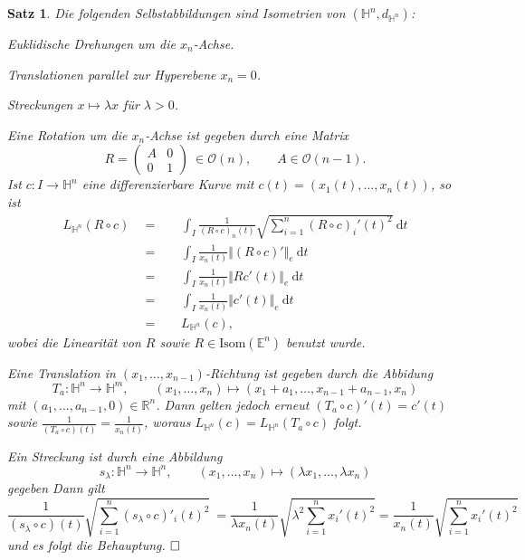\documentclass[11pt]{book}
\numberwithin{dummy}{section}
\newtheorem{theorem}{Satz}[section]
\theoremstyle{nonumberbreak}
\newenvironment{pr}[1][]{\ifthenelse{\equal{#1}{}}{\proof}{\proof[#1]}\rm}{\endproof}
\newcommand{\E}{\mathbb{E}}
\newcommand{\R}{\mathbb{R}}
\newcommand{\He}{\mathbb{H}}
\newcommand{\la}{\longrightarrow}
\begin{document}
\begin{spacing}{1.4}
\hypertarget{satzvierviereins}{}
\begin{theorem}
Die folgenden Selbstabbildungen sind Isometrien von $(\He^n, d_{\He^n})$:
\begin{compactenum}
\item Euklidische Drehungen um die $x_n$-Achse.
\item Translationen parallel zur Hyperebene $x_n=0$.
\item Streckungen $x \mapsto \lambda x$ für $\lambda >0$. 
\end{compactenum}
\begin{pr}
\begin{compactenum}
\item Eine Rotation um die $x_n$-Achse ist gegeben durch eine Matrix
$$R= \begin{pmatrix} A & 0 \\[-6pt] 0 & 1 \end{pmatrix} \ \in \mathcal{O}(n), \qquad A \in \mathcal{O}(n-1).$$
Ist $c: I \la \He^n$ eine differenzierbare Kurve mit $c(t) = (x_1(t), \ldots, x_n(t))$, so ist 
\begin{alignat*}{5}
L_{\He^n}(R \circ c) \ \ &=&& \ \ \int_I \frac{1}{(R \circ c)_n(t)} \sqrt{ \sum_{i=1}^{n} (R \circ c)_i'(t)^2} \ \mathrm{d}t \\
&=&& \ \ \int_I \frac{1}{x_n(t)} \Vert (R \circ c)' \Vert_e \ \mathrm{d}t \\
&=&& \ \ \int_I \frac{1}{x_n(t)} \Vert R c'(t) \Vert_e \ \mathrm{d}t \\
&=&& \ \ \int_I \frac{1}{x_n(t)} \Vert c'(t)\Vert_e \ \mathrm{d}t\\
&=&& \ \ L_{\He^n}(c),
\end{alignat*}
wobei die Linearität von $R$ sowie $R \in \mathrm{Isom}(\E^n)$ benutzt wurde. 
\item Eine Translation in $(x_1, \ldots, x_{n-1})$-Richtung ist gegeben durch die Abbidung 
$$T_a: \He^n \la \He^m, \qquad (x_1, \ldots, x_n) \mapsto (x_1+ a_1, \ldots, x_{n-1} + a_{n-1}, x_n)$$
mit $(a_1, \ldots, a_{n-1}, 0) \in \R^n$. Dann gelten jedoch erneut 
$(T_a \circ c)'(t) = c'(t)$ sowie $\frac{1}{(T_a \circ c)(t)} = \frac{1}{x_n(t)}$, woraus $L_{\He^n}(c) = L_{\He^n}(T_a \circ c)$ folgt.
\item Ein Streckung ist durch eine Abbildung 
$$s_{\lambda}: \He^n \la \He^n, \qquad (x_1, \ldots, x_n) \mapsto (\lambda x_1, \ldots, \lambda x_n)$$
gegeben Dann gilt
$$\frac{1}{(s_{\lambda} \circ c)(t)} \sqrt{ \sum_{i=1}^n (s_{\lambda} \circ c)'_i(t)^2} \ = \frac{1}{\lambda x_n(t)} \sqrt{ \lambda^2 \sum_{i=1}^n x_i'(t)^2} = \frac{1}{x_n(t)} \sqrt{ \sum_{i=1}^n x_i'(t)^2}$$
und es folgt die Behauptung. $\hfill \Box$
\end{compactenum}
\end{pr}
\end{theorem}



\end{spacing}
\end{document}
